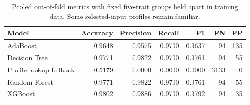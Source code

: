 \begin{table}[H]
\centering\small
\caption{Pooled out-of-fold metrics with fixed five-trait groups held apart in training data. Some selected-input profiles remain familiar.}
\begin{tabular}{lrrrrrr}
\toprule
Model & Accuracy & Precision & Recall & F1 & FN & FP \\
\midrule
AdaBoost & 0.9648 & 0.9575 & 0.9700 & 0.9637 & 94 & 135 \\
Decision Tree & 0.9771 & 0.9822 & 0.9700 & 0.9761 & 94 & 55 \\
Profile lookup fallback & 0.5179 & 0.0000 & 0.0000 & 0.0000 & 3133 & 0 \\
Random Forest & 0.9771 & 0.9822 & 0.9700 & 0.9761 & 94 & 55 \\
XGBoost & 0.9802 & 0.9886 & 0.9700 & 0.9792 & 94 & 35 \\
\bottomrule
\end{tabular}
\end{table}
